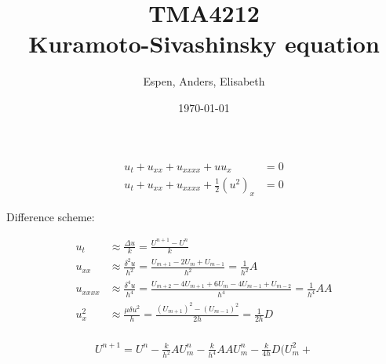 \documentclass[16pt]{article}
\title{TMA4212 \\ Kuramoto-Sivashinsky equation}
\author{Espen, Anders, Elisabeth}
\date{\today}
\begin{document}
\huge


\begin{align*}
u_t + u_{xx} + u_{xxxx} + uu_x &= 0 \\
u_t + u_{xx} + u_{xxxx} + \frac{1}{2}(u^2)_x &= 0
\end{align*}

Difference scheme:

\LARGE
\begin{align*}
u_t &\approx \frac{\Delta u}{k} = \frac{U^{n+1}-U^n}{k} \\
u_{xx} &\approx \frac{\delta^2 u}{h^2} = \frac{U_{m+1}-2U_{m}+U_{m-1}}{h^2} = \frac{1}{h^2}A \\
u_{xxxx} &\approx \frac{\delta^4 u}{h^4} = \frac{U_{m+2}-4U_{m+1}+6U_m-4U_{m-1}+U_{m-2}}{h^4} = \frac{1}{h^4}AA\\
u^2_{x} &\approx \frac{\mu \delta u^2}{h} = \frac{(U_{m+1})^2-(U_{m-1})^2}{2h} = \frac{1}{2h}D\\
\end{align*}

\begin{align*}
U^{n+1} = U^n - \frac{k}{h^2}AU^n_m - \frac{k}{h^4}AAU^n_m - \frac{k}{4h}D(U_m^2+
\end{align*}
\end{document}
